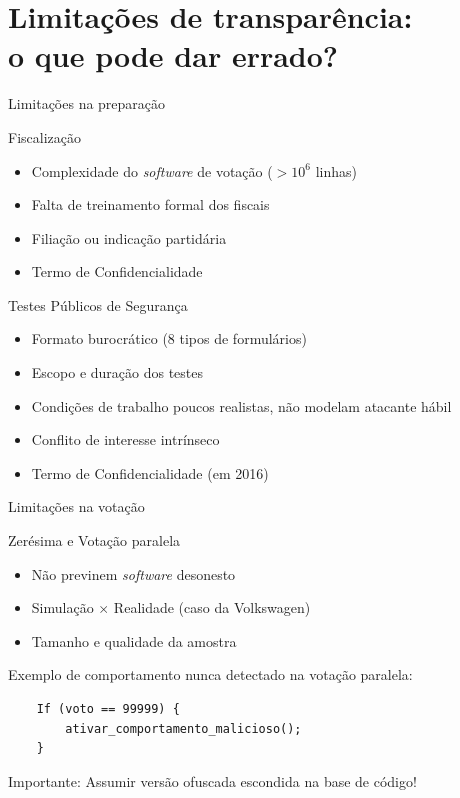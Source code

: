 \documentclass[10pt]{beamer}
\begin{document}
\section{Limitações de transparência:\\ o que pode dar errado?}

\begin{frame}{Limitações na preparação}

\begin{block}{\alert{Fiscalização}}
\begin{itemize}
 \item Complexidade do \emph{software} de votação ($> 10^6$ linhas)
 \item Falta de treinamento formal dos fiscais
 \item Filiação ou indicação partidária
 \item Termo de Confidencialidade
\end{itemize}
\end{block}

\begin{block}{\alert{Testes Públicos de Segurança}}
\begin{itemize}
 \item Formato burocrático (8 tipos de formulários)
 \item Escopo e duração dos testes
 \item Condições de trabalho poucos realistas, não modelam atacante hábil
 \item Conflito de interesse intrínseco
 \item Termo de Confidencialidade (em 2016)
\end{itemize}
\end{block}
 
\end{frame}

\begin{frame}[fragile]{Limitações na votação}

\begin{block}{\alert{Zerésima e Votação paralela}}
\begin{itemize}
 \item Não previnem \emph{software} desonesto
 \item Simulação $\times$ Realidade (caso da Volkswagen)
 \item Tamanho e qualidade da amostra
\end{itemize}
\end{block}

\pause
Exemplo de comportamento nunca detectado na votação paralela:
\begin{verbatim}
    If (voto == 99999) {
        ativar_comportamento_malicioso();
    }
\end{verbatim}

\alert{Importante:} Assumir versão ofuscada escondida na base de código!
\end{frame}
\end{document}
